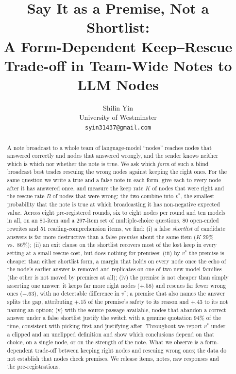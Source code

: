 \documentclass[11pt]{article}
\title{Say It as a Premise, Not a Shortlist:\\A Form-Dependent Keep--Rescue Trade-off in Team-Wide Notes to LLM Nodes}
\author{Shilin Yin \\
  University of Westminster \\
  \texttt{syin31437@gmail.com}}
\begin{document}
\maketitle

\begin{abstract}
A note broadcast to a whole team of language-model ``nodes'' reaches nodes that answered correctly and nodes that answered wrongly, and the sender knows neither which is which nor whether the note is true. We ask which \emph{form} of such a blind broadcast best trades rescuing the wrong nodes against keeping the right ones. For the same question we write a true and a false note in each form, give each to every node after it has answered once, and measure the keep rate $K$ of nodes that were right and the rescue rate $B$ of nodes that were wrong; the two combine into $v^\ast$, the smallest probability that the note is true at which broadcasting it has non-negative expected value. Across eight pre-registered rounds, six to eight nodes per round and ten models in all, on an 80-item and a 297-item set of multiple-choice questions, 80 open-ended rewrites and 51 reading-comprehension items, we find: (i) a false \emph{shortlist} of candidate answers is far more destructive than a false \emph{premise} about the same item ($K$ 29\% vs.\ 86\%); (ii) an exit clause on the shortlist recovers most of the lost keep in every setting at a small rescue cost, but does nothing for premises; (iii) by $v^\ast$ the premise is cheaper than either shortlist form, a margin that holds on every node once the echo of the node's earlier answer is removed and replicates on one of two new model families (the other is not moved by premises at all); (iv) the premise is not cheaper than simply asserting one answer: it keeps far more right nodes ($+.58$) and rescues far fewer wrong ones ($-.63$), with no detectable difference in $v^\ast$; a premise that also names the answer splits the gap, attributing $+.15$ of the premise's safety to its reason and $+.43$ to its not naming an option; (v) with the source passage available, nodes that abandon a correct answer under a false shortlist justify the switch with a genuine quotation 94\% of the time, consistent with picking first and justifying after. Throughout we report $v^\ast$ under a clipped and an unclipped definition and show which conclusions depend on that choice, on a single node, or on the strength of the note. What we observe is a form-dependent trade-off between keeping right nodes and rescuing wrong ones; the data do not establish that nodes check premises. We release items, notes, raw responses and the pre-registrations.
\end{abstract}
\end{document}
